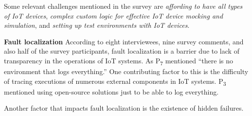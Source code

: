 \begin{table}%
\caption{Survey Results: Bug Taxonomy}
\label{tab2}
\end{table}

Some relevant challenges mentioned in the survey are \emph{affording to have all types of IoT devices}, \emph{complex custom logic for effective IoT device mocking and simulation}, and \emph{setting up test environments with IoT devices}. 

\textbf{Fault localization}
According to eight interviewees, nine survey comments, and also half of the survey participants, fault localization is a barrier due to lack of transparency in the operations of IoT systems. As P\textsubscript{7} mentioned \enquote{there is no environment that logs everything.} One contributing factor to this is the difficulty of tracing executions of numerous external components in IoT systems. P\textsubscript{3} mentioned using open-source solutions just to be able to log everything. 


Another factor that impacts fault localization is the existence of hidden failures. 

